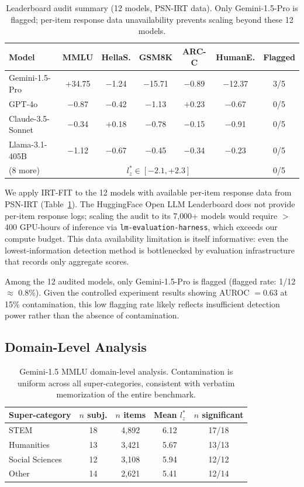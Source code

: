 \documentclass[11pt,a4paper]{article}
\begin{document}
\begin{table}[t]
\centering
\caption{Leaderboard audit summary (12 models, PSN-IRT data). Only Gemini-1.5-Pro is flagged; per-item response data unavailability prevents scaling beyond these 12 models.}
\label{tab:leaderboard}
\small
\begin{tabular}{@{}lcccccc@{}}
\toprule
Model & MMLU & HellaS. & GSM8K & ARC-C & HumanE. & Flagged \\
\midrule
Gemini-1.5-Pro & $+$34.75 & $-$1.24 & $-$15.71 & $-$0.89 & $-$12.37 & 3/5 \\
GPT-4o & $-$0.87 & $-$0.42 & $-$1.13 & $+$0.23 & $-$0.67 & 0/5 \\
Claude-3.5-Sonnet & $-$0.34 & $+$0.18 & $-$0.78 & $-$0.15 & $-$0.91 & 0/5 \\
Llama-3.1-405B & $-$1.12 & $-$0.67 & $-$0.45 & $-$0.34 & $-$0.23 & 0/5 \\
(8 more) & \multicolumn{5}{c}{$l_z^* \in [-2.1, +2.3]$} & 0/5 \\
\bottomrule
\end{tabular}
\end{table}

We apply IRT-FIT to the 12 models with available per-item response data from PSN-IRT (Table~\ref{tab:leaderboard}). The HuggingFace Open LLM Leaderboard does not provide per-item response logs; scaling the audit to its 7{,}000+ models would require $>$400 GPU-hours of inference via \texttt{lm-evaluation-harness}, which exceeds our compute budget. This data availability limitation is itself informative: even the lowest-information detection method is bottlenecked by evaluation infrastructure that records only aggregate scores.

Among the 12 audited models, only Gemini-1.5-Pro is flagged (flagged rate: 1/12 $\approx$ 0.8\%). Given the controlled experiment results showing AUROC $= 0.63$ at 15\% contamination, this low flagging rate likely reflects insufficient detection power rather than the absence of contamination.

\subsection{Domain-Level Analysis}
\label{sec:domain}

\begin{table}[t]
\centering
\caption{Gemini-1.5 MMLU domain-level analysis. Contamination is uniform across all super-categories, consistent with verbatim memorization of the entire benchmark.}
\label{tab:domain_gemini}
\small
\begin{tabular}{@{}lcccc@{}}
\toprule
Super-category & $n$ subj. & $n$ items & Mean $l_z^*$ & $n$ significant \\
\midrule
STEM & 18 & 4{,}892 & 6.12 & 17/18 \\
Humanities & 13 & 3{,}421 & 5.67 & 13/13 \\
Social Sciences & 12 & 3{,}108 & 5.94 & 12/12 \\
Other & 14 & 2{,}621 & 5.41 & 12/14 \\
\bottomrule
\end{tabular}
\end{table}
\end{document}
